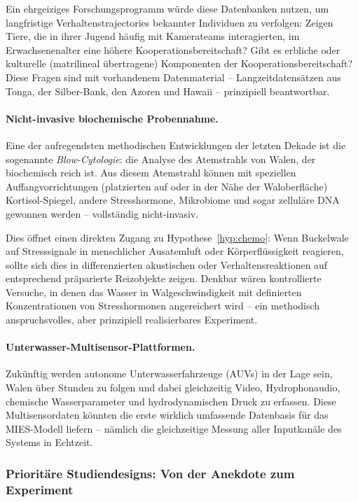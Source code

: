 ﻿\documentclass[12pt,a4paper]{article}
\theoremstyle{definition}
\theoremstyle{remark}
\begin{document}
Ein ehrgeiziges Forschungsprogramm würde diese Datenbanken nutzen, um langfristige Verhaltenstrajectories bekannter Individuen zu verfolgen: Zeigen Tiere, die in ihrer Jugend häufig mit Kamerateams interagierten, im Erwachsenenalter eine höhere Kooperationsbereitschaft? Gibt es erbliche oder kulturelle (matrilineal übertragene) Komponenten der Kooperationsbereitschaft? Diese Fragen sind mit vorhandenem Datenmaterial -- Langzeitdatensätzen aus Tonga, der Silber-Bank, den Azoren und Hawaii -- prinzipiell beantwortbar.

\paragraph{Nicht-invasive biochemische Probennahme.}
Eine der aufregendsten methodischen Entwicklungen der letzten Dekade ist die sogenannte \emph{Blow-Cytologie}: die Analyse des Atemstrahls von Walen, der biochemisch reich ist. Aus diesem Atemstrahl können mit speziellen Auffangvorrichtungen (platzierten auf oder in der Nähe der Waloberfläche) Kortisol-Spiegel, andere Stresshormone, Mikrobiome und sogar zelluläre DNA gewonnen werden -- vollständig nicht-invasiv.

Dies öffnet einen direkten Zugang zu Hypothese~\ref{hyp:chemo}: Wenn Buckelwale auf Stresssignale in menschlicher Ausatemluft oder Körperflüssigkeit reagieren, sollte sich dies in differenzierten akustischen oder Verhaltensreaktionen auf entsprechend präparierte Reizobjekte zeigen. Denkbar wären kontrollierte Versuche, in denen das Wasser in Walgeschwindigkeit mit definierten Konzentrationen von Stresshormonen angereichert wird -- ein methodisch anspruchsvolles, aber prinzipiell realisierbares Experiment.

\paragraph{Unterwasser-Multisensor-Plattformen.}
Zukünftig werden autonome Unterwasserfahrzeuge (AUVs) in der Lage sein, Walen über Stunden zu folgen und dabei gleichzeitig Video, Hydrophonaudio, chemische Wasserparameter und hydrodynamischen Druck zu erfassen. Diese Multisensordaten könnten die erste wirklich umfassende Datenbasis für das MIES-Modell liefern -- nämlich die gleichzeitige Messung aller Inputkanäle des Systems in Echtzeit.

\subsubsection{Prioritäre Studiendesigns: Von der Anekdote zum Experiment}
\end{document}
